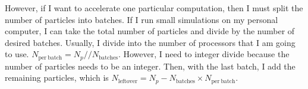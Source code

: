     However, if I want to accelerate one particular computation, then I must split the number of particles into batches. If I run small simulations on my personal computer, I can take the total number of particles and divide by the number of desired batches. Usually, I divide into the number of processors that I am going to use. $N_\mathrm{per~batch}=N_p//N_\mathrm{batches}$. However, I need to integer divide because the number of particles needs to be an integer. Then, with the last batch, I add the remaining particles, which is $N_\mathrm{left over} = N_p - N_\mathrm{batches} \times N_\mathrm{per~batch}$. 



